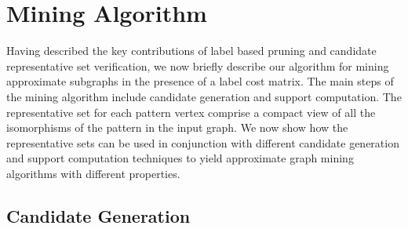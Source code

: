 \section{Mining Algorithm}
\label{sec:mining}

Having described the key contributions of label based pruning and
candidate representative set verification, we now briefly describe our
algorithm for mining approximate subgraphs in the presence of a label
cost matrix. The main steps of the mining algorithm include candidate
generation and support computation.  The representative set for each
pattern vertex comprise a compact view of all the isomorphisms of the
pattern in the input graph. We now show how the representative sets can
be used in conjunction with different candidate generation and support
computation techniques to yield approximate graph mining algorithms with
different properties.


\subsection{Candidate Generation} 


